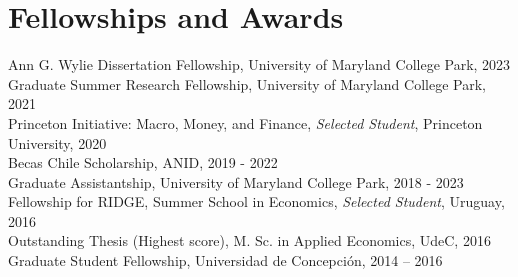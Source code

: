 \documentclass[11pt]{article}
\begin{document}
\section*{Fellowships and Awards}
Ann G. Wylie Dissertation Fellowship, University of Maryland College Park, 2023  \\
Graduate Summer Research Fellowship, University of Maryland College Park, 2021\\
Princeton Initiative: Macro, Money, and Finance, \emph{Selected Student}, Princeton University, 2020\\
Becas Chile Scholarship, ANID, 2019 - 2022\\
Graduate Assistantship, University of Maryland College Park, 2018 - 2023\\
Fellowship for RIDGE, Summer School in Economics, \emph{Selected Student}, Uruguay, 2016\\
Outstanding Thesis (Highest score), M. Sc. in Applied Economics, UdeC, 2016\\
Graduate Student Fellowship, Universidad de Concepci\'on, 2014 -- 2016

\iffalse
\section*{Datasets}

``\emph{Chilean Economic Uncertainty Index}", which tracks economic uncertainty in the Chilean economy. Reported monthly by \href{http://www.clapesuc.cl/indicador/indice-de-incertidumbre-economica-iiec/}{CLAPES UC}.\\
``\emph{Chilean Economic Policy Uncertainty Index}", which tracks economic policy uncertainty in the Chilean economy. Reported monthly at the \href{http://www.policyuncertainty.com/chile_monthly.html}{Economic Policy Uncertainty} website managed by Scott Baker (Northwestern-Kellogg), Nicholas Bloom (Stanford) and Steve Davis (Chicago-Booth).
\fi


\end{document}
